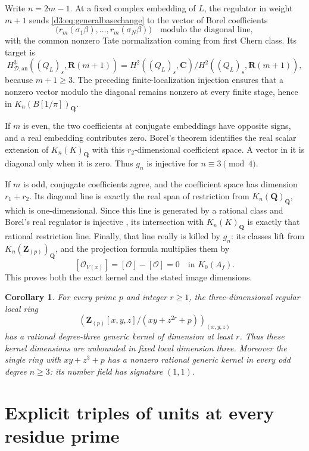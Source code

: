 \documentclass[11pt,a4paper]{amsart}
\numberwithin{equation}{section}
\newtheorem{corollary}[theorem]{Corollary}
\theoremstyle{definition}
\theoremstyle{remark}
\newcommand{\Q}{\mathbf Q}
\newcommand{\Z}{\mathbf Z}
\newcommand{\R}{\mathbf R}
\newcommand{\C}{\mathbf C}
\newcommand{\OO}{\mathcal O}
\newcommand{\HD}{H_{\mathcal D,\mathrm{an}}}
\begin{document}
Write $n=2m-1$. At a fixed complex embedding of $L$, the regulator in weight $m+1$ sends \eqref{d3:eq:generalbasechange} to the vector of Borel coefficients
\[
\bigl(r_m(\sigma_1\beta),\ldots,r_m(\sigma_N\beta)\bigr)
\quad\text{modulo the diagonal line},
\]
with the common nonzero Tate normalization coming from first Chern class. Its target is
\[
\HD^3((Q_L)_s,\R(m+1))
=H^2((Q_L)_s,\C)/H^2((Q_L)_s,\R(m+1)),
\]
because $m+1\geq3$. The preceding finite-localization injection ensures that a nonzero vector modulo the diagonal remains nonzero at every finite stage, hence in $K_n(B[1/\pi])_{\Q}$.

If $m$ is even, the two coefficients at conjugate embeddings have opposite signs, and a real embedding contributes zero. Borel's theorem \cite[Proposition~12.2]{Borel} identifies the real scalar extension of $K_n(K)_{\Q}$ with this $r_2$-dimensional coefficient space. A vector in it is diagonal only when it is zero. Thus $g_n$ is injective for $n\equiv3\pmod4$.

If $m$ is odd, conjugate coefficients agree, and the coefficient space has dimension $r_1+r_2$. Its diagonal line is exactly the real span of restriction from $K_n(\Q)_{\Q}$, which is one-dimensional. Since this line is generated by a rational class and Borel's real regulator is injective \cite[Section~6]{BunkeTamme}, its intersection with $K_n(K)_{\Q}$ is exactly that rational restriction line. Finally, that line really is killed by $g_n$: its classes lift from $K_n(\Z_{(p)})_{\Q}$, and the projection formula multiplies them by
\[
[\OO_{V(x)}]=[\OO]-[\OO]=0\quad\text{in }K_0(A_f).
\]
This proves both the exact kernel and the stated image dimensions.

\begin{corollary}
For every prime $p$ and integer $r\geq1$, the three-dimensional regular local ring
\[
\left(\Z_{(p)}[x,y,z]/(xy+z^{2r}+p)\right)_{(x,y,z)}
\]
has a rational degree-three generic kernel of dimension at least $r$. Thus these kernel dimensions are unbounded in fixed local dimension three. Moreover the single ring with $xy+z^3+p$ has a nonzero rational generic kernel in every odd degree $n\geq3$: its number field has signature $(1,1)$.
\end{corollary}

\section{Explicit triples of units at every residue prime}\label{d3:sec:explicitallprimes}
\end{document}
